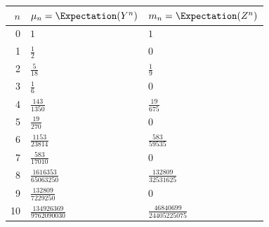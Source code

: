 \begin{tabular}{@{}rll@{}}
\toprule
$n$ & $\mu_n=\Expectation(Y^n)$ & $m_n=\Expectation(Z^n)$ \\
\midrule
0 & $1$ & $1$ \\
1 & $\frac{1}{2}$ & $0$ \\
2 & $\frac{5}{18}$ & $\frac{1}{9}$ \\
3 & $\frac{1}{6}$ & $0$ \\
4 & $\frac{143}{1350}$ & $\frac{19}{675}$ \\
5 & $\frac{19}{270}$ & $0$ \\
6 & $\frac{1153}{23814}$ & $\frac{583}{59535}$ \\
7 & $\frac{583}{17010}$ & $0$ \\
8 & $\frac{1616353}{65063250}$ & $\frac{132809}{32531625}$ \\
9 & $\frac{132809}{7229250}$ & $0$ \\
10 & $\frac{134926369}{9762090030}$ & $\frac{46840699}{24405225075}$ \\
\bottomrule
\end{tabular}
